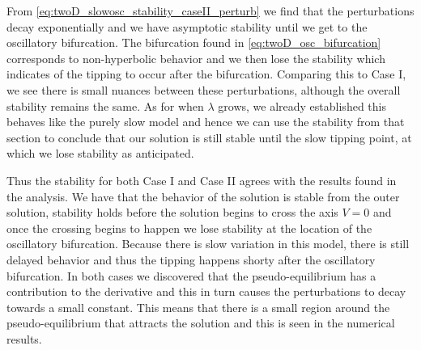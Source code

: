 From \eqref{eq:twoD_slowosc_stability_caseII_perturb} we find that the perturbations decay exponentially and we have asymptotic stability until we get to the oscillatory bifurcation. The bifurcation found in \eqref{eq:twoD_osc_bifurcation} corresponds to non-hyperbolic behavior and we then lose the stability which indicates of the tipping to occur after the bifurcation. Comparing this to Case I, we see there is small nuances between these perturbations, although the overall stability remains the same. As for when $\lambda$ grows, we already established this behaves like the purely slow model and hence we can use the stability from that section to conclude that our solution is still stable until the slow tipping point, at which we lose stability as anticipated.


Thus the stability for both Case I and Case II agrees with the results found in the analysis. We have that the behavior of the solution is stable from the outer solution, stability holds before the solution begins to cross the axis $V=0$ and once the crossing begins to happen we lose stability at the location of the oscillatory bifurcation. Because there is slow variation in this model, there is still delayed behavior and thus the tipping happens shorty after the oscillatory bifurcation. In both cases we discovered that the pseudo-equilibrium has a contribution to the derivative and this in turn causes the perturbations to decay towards a small constant. This means that there is a small region around the pseudo-equilibrium that attracts the solution and this is seen in the numerical results. 
